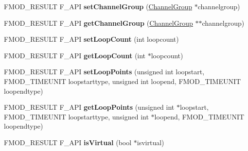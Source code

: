 \begin{DoxyCompactItemize}
\item 
\hypertarget{class_f_m_o_d_1_1_channel_a570b83eb8178325a131b081a8d5ffd81}{F\+M\+O\+D\+\_\+\+R\+E\+S\+U\+L\+T F\+\_\+\+A\+P\+I {\bfseries set\+Channel\+Group} (\hyperlink{class_f_m_o_d_1_1_channel_group}{Channel\+Group} $\ast$channelgroup)}\label{class_f_m_o_d_1_1_channel_a570b83eb8178325a131b081a8d5ffd81}

\item 
\hypertarget{class_f_m_o_d_1_1_channel_a4b6d310d04eb844190db7a4074af2b2c}{F\+M\+O\+D\+\_\+\+R\+E\+S\+U\+L\+T F\+\_\+\+A\+P\+I {\bfseries get\+Channel\+Group} (\hyperlink{class_f_m_o_d_1_1_channel_group}{Channel\+Group} $\ast$$\ast$channelgroup)}\label{class_f_m_o_d_1_1_channel_a4b6d310d04eb844190db7a4074af2b2c}

\item 
\hypertarget{class_f_m_o_d_1_1_channel_a7dc161cf3a929cd48da580634059f6a6}{F\+M\+O\+D\+\_\+\+R\+E\+S\+U\+L\+T F\+\_\+\+A\+P\+I {\bfseries set\+Loop\+Count} (int loopcount)}\label{class_f_m_o_d_1_1_channel_a7dc161cf3a929cd48da580634059f6a6}

\item 
\hypertarget{class_f_m_o_d_1_1_channel_a23128bf2475ef316e1c38a3606ccbfd0}{F\+M\+O\+D\+\_\+\+R\+E\+S\+U\+L\+T F\+\_\+\+A\+P\+I {\bfseries get\+Loop\+Count} (int $\ast$loopcount)}\label{class_f_m_o_d_1_1_channel_a23128bf2475ef316e1c38a3606ccbfd0}

\item 
\hypertarget{class_f_m_o_d_1_1_channel_abcac3fd6f8fb5a3f1097237a9ff00ee6}{F\+M\+O\+D\+\_\+\+R\+E\+S\+U\+L\+T F\+\_\+\+A\+P\+I {\bfseries set\+Loop\+Points} (unsigned int loopstart, F\+M\+O\+D\+\_\+\+T\+I\+M\+E\+U\+N\+I\+T loopstarttype, unsigned int loopend, F\+M\+O\+D\+\_\+\+T\+I\+M\+E\+U\+N\+I\+T loopendtype)}\label{class_f_m_o_d_1_1_channel_abcac3fd6f8fb5a3f1097237a9ff00ee6}

\item 
\hypertarget{class_f_m_o_d_1_1_channel_a32b040f752fc4fba7d46054ddbd6b913}{F\+M\+O\+D\+\_\+\+R\+E\+S\+U\+L\+T F\+\_\+\+A\+P\+I {\bfseries get\+Loop\+Points} (unsigned int $\ast$loopstart, F\+M\+O\+D\+\_\+\+T\+I\+M\+E\+U\+N\+I\+T loopstarttype, unsigned int $\ast$loopend, F\+M\+O\+D\+\_\+\+T\+I\+M\+E\+U\+N\+I\+T loopendtype)}\label{class_f_m_o_d_1_1_channel_a32b040f752fc4fba7d46054ddbd6b913}

\item 
\hypertarget{class_f_m_o_d_1_1_channel_aba59130d19b04270bbe8d765d79018f9}{F\+M\+O\+D\+\_\+\+R\+E\+S\+U\+L\+T F\+\_\+\+A\+P\+I {\bfseries is\+Virtual} (bool $\ast$isvirtual)}\label{class_f_m_o_d_1_1_channel_aba59130d19b04270bbe8d765d79018f9}


\end{DoxyCompactItemize}
